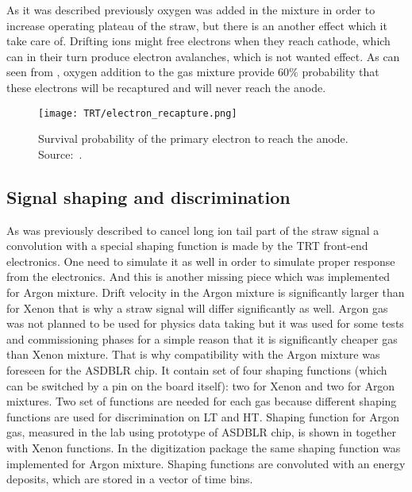 As it was described previously oxygen was added in the mixture in order to increase operating plateau of the straw, but there is an another effect which it take care of.
Drifting ions might free electrons when they reach cathode, which can in their turn produce electron avalanches, which is not wanted effect.
As can seen from , oxygen addition to the gas mixture provide 60$\%$ probability that these electrons will be recaptured 
and will never reach the anode. 

\begin{figure}
\centering
\texttt{[image: TRT/electron\_recapture.png]}
\caption{ 
 Survival probability of the primary electron to reach the anode. Source:~\cite{esben_thesis}.
}
\label{fig:electron_recapture}
\end{figure}

\subsection{Signal shaping and discrimination}


As was previously described to cancel long ion tail part of the straw signal a convolution with a special shaping function is made by the TRT front-end electronics.
One need to simulate it as well in order to simulate proper response from the electronics. 
And this is another missing piece which was implemented for Argon mixture. 
Drift velocity in the Argon mixture is significantly larger than for Xenon that is why a straw signal will differ significantly as well.
Argon gas was not planned to be used for physics data taking but it was used for some tests and commissioning phases for a simple reason that it is significantly
cheaper gas than Xenon mixture. That is why compatibility with the Argon mixture was foreseen for the ASDBLR chip. It contain set of four shaping functions (which can be switched
by a pin on the board itself): two for Xenon and two for Argon mixtures. Two set of functions are needed for each gas because different shaping functions are used for discrimination
on LT and HT. Shaping function for Argon gas, measured in the lab using prototype of ASDBLR chip, is shown in  together with Xenon functions.
In the digitization package the same shaping function was implemented for Argon mixture. Shaping functions are convoluted with an energy deposits, which are stored in a vector of time bins.

